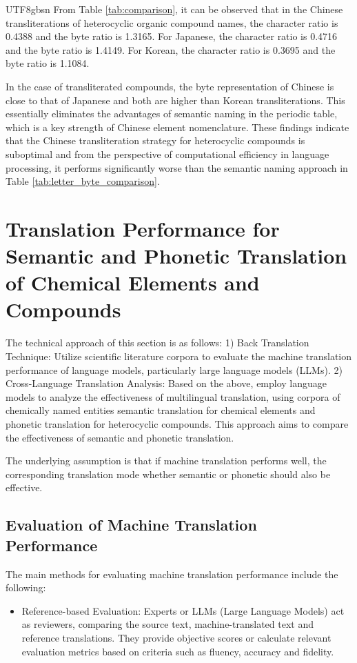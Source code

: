 \documentclass[conference]{IEEEtran}
\begin{document}
\begin{CJK*}{UTF8}{gbsn}
From Table \ref{tab:comparison}, it can be observed that in the Chinese transliterations of heterocyclic organic compound names, the character ratio is 0.4388 and the byte ratio is 1.3165. For Japanese, the character ratio is 0.4716 and the byte ratio is 1.4149. For Korean, the character ratio is 0.3695 and the byte ratio is 1.1084.

In the case of transliterated compounds, the byte representation of Chinese is close to that of Japanese and both are higher than Korean transliterations. This essentially eliminates the advantages of semantic naming in the periodic table, which is a key strength of Chinese element nomenclature. These findings indicate that the Chinese transliteration strategy for heterocyclic compounds is suboptimal and from the perspective of computational efficiency in language processing, it performs significantly worse than the semantic naming approach in Table \ref{tab:letter_byte_comparison}.

\section{Translation Performance for Semantic and Phonetic Translation of Chemical Elements and Compounds}
The technical approach of this section is as follows: 1) Back Translation Technique: Utilize scientific literature corpora to evaluate the machine translation performance of language models, particularly large language models (LLMs). 2) Cross-Language Translation Analysis: Based on the above, employ language models to analyze the effectiveness of multilingual translation, using corpora of chemically named entities semantic translation for chemical elements and phonetic translation for heterocyclic compounds. This approach aims to compare the effectiveness of semantic and phonetic translation.

The underlying assumption is that if machine translation performs well, the corresponding translation mode whether semantic or phonetic should also be effective.

\subsection{Evaluation of Machine Translation Performance}
The main methods for evaluating machine translation performance include the following:
\begin{itemize}
   
 \item Reference-based Evaluation: Experts or LLMs (Large Language Models) act as reviewers, comparing the source text, machine-translated text and reference translations. They provide objective scores or calculate relevant evaluation metrics based on criteria such as fluency, accuracy and fidelity.


\end{itemize}
\end{CJK*}
\end{document}

